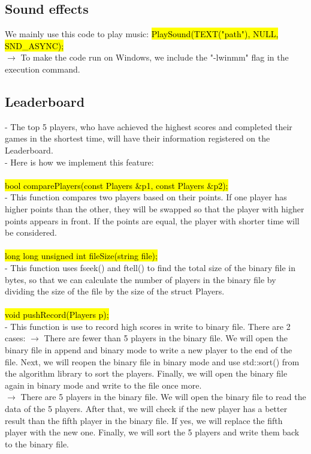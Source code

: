 \documentclass[12pt,a4paper]{report}
\begin{document}
\subsection{Sound effects}
\indent We mainly use this code to play music: 
\hl{PlaySound(TEXT("path"), NULL, SND\_ASYNC);}\\
$\rightarrow$ To make the code run on Windows, we include the "-lwinmm" flag in the execution command.
\subsection{Leaderboard}
- The top 5 players, who have achieved the highest scores and completed their games in the shortest time, will have their information registered on the Leaderboard.\\
- Here is how we implement this feature:\\
\\
\hl{bool comparePlayers(const Players \&p1, const Players \&p2);} \\
\indent - This function compares two players based on their points. If one player has higher points than the other, they will be swapped so that the player with higher points appears in front. If the points are equal, the player with shorter time will be considered. \\
\\
\hl{long long unsigned int fileSize(string file);}\\
\indent - This function uses fseek() and ftell() to find the total size of the binary file in bytes, so that we can calculate the number of players in the binary file by dividing the size of the file by the size of the struct Players.\\
\\
\hl{void pushRecord(Players p);}\\
\indent - This function is use to record high scores in write to binary file. There are 2 cases:
\indent $\rightarrow$ There are fewer than 5 players in the binary file. We will open the binary file in append and binary mode to write a new player to the end of the file. Next, we will reopen the binary file in binary mode and use std::sort() from the algorithm library to sort the players. Finally, we will open the binary file again in binary mode and write to the file once more.\\
\indent $\rightarrow$ There are 5 players in the binary file. We will open the binary file to read the data of the 5 players. After that, we will check if the new player has a better result than the fifth player in the binary file. If yes, we will replace the fifth player with the new one. Finally, we will sort the 5 players and write them back to the binary file.\\
\end{document}
